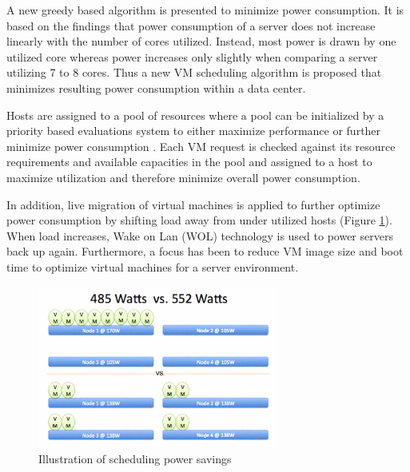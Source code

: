 A new greedy based algorithm is presented to minimize power consumption. It is based on the findings that power consumption of a server does not increase linearly with the number of cores utilized. Instead, most power is drawn by one utilized core whereas power increases only slightly when comparing a server utilizing 7 to 8 cores. Thus a new VM scheduling algorithm is proposed that minimizes resulting power consumption within a data center. 

Hosts are assigned to a pool of resources where a pool can be initialized by a priority based evaluations system to either maximize performance or further minimize power consumption \cite{younge2010efficient}. Each VM request is checked against its resource requirements and available capacities in the pool and assigned to a host to maximize utilization and therefore minimize overall power consumption. 

In addition, live migration of virtual machines is applied to further optimize power consumption by shifting load away from under utilized hosts (Figure \ref{fig:server_power_consumption}). When load increases, Wake on Lan (WOL) technology is used to power servers back up again. Furthermore, a focus has been to reduce VM image size and boot time to optimize virtual machines for a server environment. 


\begin{figure}[htbp]
	\centering
		\includegraphics[width=0.7\textwidth]{figures/state_of_the_art/server_power_consumption.PNG}
	\caption{Illustration of scheduling power savings \cite{younge2010efficient}}
	\label{fig:server_power_consumption}
\end{figure}

